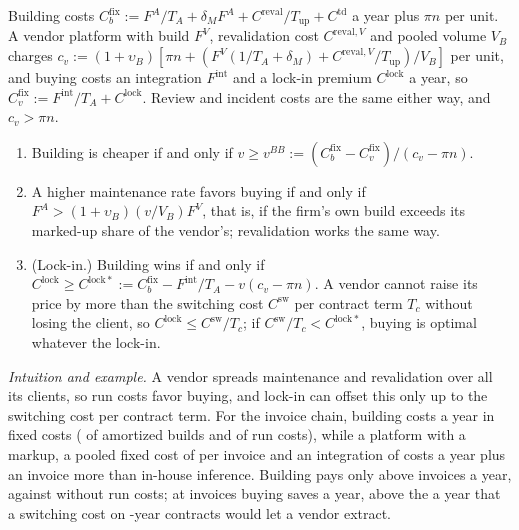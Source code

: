 \begin{proposition}\label{prop:tasks-buildbuy}
Building costs $C^{\mathrm{fix}}_b:=F^A/T_A+\delta_MF^A+C^{\mathrm{reval}}/T_{\mathrm{up}}+C^{\mathrm{td}}$ a year plus $\pi n$ per unit. A vendor platform with build $F^V$, revalidation cost $C^{\mathrm{reval},V}$ and pooled volume $V_B$ charges $c_v:=(1+\upsilon_B)[\pi n+(F^V(1/T_A+\delta_M)+C^{\mathrm{reval},V}/T_{\mathrm{up}})/V_B]$ per unit, and buying costs an integration $F^{\mathrm{int}}$ and a lock-in premium $C^{\mathrm{lock}}$ a year, so $C^{\mathrm{fix}}_v:=F^{\mathrm{int}}/T_A+C^{\mathrm{lock}}$. Review and incident costs are the same either way, and $c_v>\pi n$.
\begin{enumerate}
\item[(a)] Building is cheaper if and only if $v\ge v^{BB}:=(C^{\mathrm{fix}}_b-C^{\mathrm{fix}}_v)/(c_v-\pi n)$.
\item[(b)] A higher maintenance rate favors buying if and only if $F^A>(1+\upsilon_B)(v/V_B)F^V$, that is, if the firm's own build exceeds its marked-up share of the vendor's; revalidation works the same way.
\item[(c)] (Lock-in.) Building wins if and only if $C^{\mathrm{lock}}\ge C^{\mathrm{lock}*}:=C^{\mathrm{fix}}_b-F^{\mathrm{int}}/T_A-v(c_v-\pi n)$. A vendor cannot raise its price by more than the switching cost $C^{\mathrm{sw}}$ per contract term $T_c$ without losing the client, so $C^{\mathrm{lock}}\le C^{\mathrm{sw}}/T_c$; if $C^{\mathrm{sw}}/T_c<C^{\mathrm{lock}*}$, buying is optimal whatever the lock-in.
\end{enumerate}
\end{proposition}

\noindent\emph{Intuition and example.} A vendor spreads maintenance and revalidation over all its clients, so run costs favor buying, and lock-in can offset this only up to the switching cost per contract term. For the invoice chain, building costs \icBBfix{} a year in fixed costs (\icBBbuilds{} of amortized builds and \icBBrun{} of run costs), while a platform with a \icBBmarkup{} markup, a pooled fixed cost of \icBBpooled{} per invoice and an integration of \icBBint{} costs \icBBfixv{} a year plus \icBBcv{} an invoice more than in-house inference. Building pays only above \icBBv{} invoices a year, against \icBBvnorun{} without run costs; at \icVolume{} invoices buying saves \icBBsave{} a year, above the \icBBlock{} a year that a \icBBsw{} switching cost on \icContractYears-year contracts would let a vendor extract.

